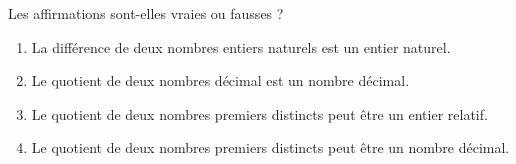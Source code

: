 
Les affirmations sont-elles vraies ou fausses ?
\begin{enumerate}
\item La différence de deux nombres entiers naturels est un entier naturel.
\item Le quotient de deux nombres décimal est un nombre décimal.
\item Le quotient de deux nombres premiers distincts peut être un entier relatif.
\item Le quotient de deux nombres premiers distincts peut être un nombre décimal.
\end{enumerate}